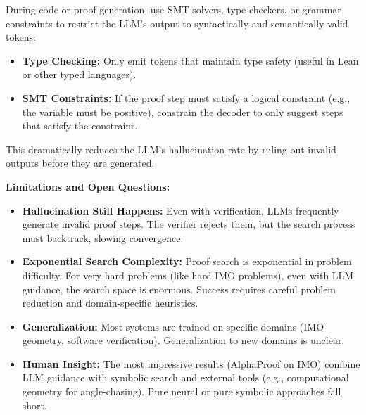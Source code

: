 During code or proof generation, use SMT solvers, type checkers, or grammar constraints to restrict the LLM's output to syntactically and semantically valid tokens:
\begin{itemize}
    \item \textbf{Type Checking:} Only emit tokens that maintain type safety (useful in Lean or other typed languages).
    \item \textbf{SMT Constraints:} If the proof step must satisfy a logical constraint (e.g., the variable must be positive), constrain the decoder to only suggest steps that satisfy the constraint.
\end{itemize}
This dramatically reduces the LLM's hallucination rate by ruling out invalid outputs before they are generated.

\textbf{Limitations and Open Questions:}

\begin{itemize}
    \item \textbf{Hallucination Still Happens:} Even with verification, LLMs frequently generate invalid proof steps. The verifier rejects them, but the search process must backtrack, slowing convergence.
    \item \textbf{Exponential Search Complexity:} Proof search is exponential in problem difficulty. For very hard problems (like hard IMO problems), even with LLM guidance, the search space is enormous. Success requires careful problem reduction and domain-specific heuristics.
    \item \textbf{Generalization:} Most systems are trained on specific domains (IMO geometry, software verification). Generalization to new domains is unclear.
    \item \textbf{Human Insight:} The most impressive results (AlphaProof on IMO) combine LLM guidance with symbolic search and external tools (e.g., computational geometry for angle-chasing). Pure neural or pure symbolic approaches fall short.
\end{itemize}


